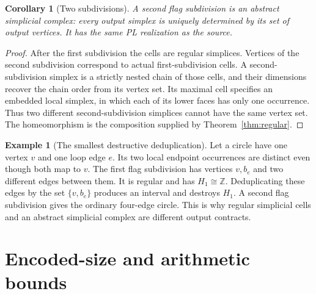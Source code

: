 \documentclass[11pt]{article}
\newtheorem{corollary}[theorem]{Corollary}
\theoremstyle{definition}\newtheorem{definition}[theorem]{Definition}
\newtheorem{example}[theorem]{Example}
\theoremstyle{remark}\newtheorem{remark}[theorem]{Remark}
\newcommand{\Z}{\mathbb Z}
\begin{document}
\begin{corollary}[Two subdivisions]\label{cor:two}
A second flag subdivision is an abstract simplicial complex: every output simplex is uniquely determined by its set of output vertices. It has the same PL realization as the source.
\end{corollary}
\begin{proof}
After the first subdivision the cells are regular simplices. Vertices of the second subdivision correspond to actual first-subdivision cells. A second-subdivision simplex is a strictly nested chain of those cells, and their dimensions recover the chain order from its vertex set. Its maximal cell specifies an embedded local simplex, in which each of its lower faces has only one occurrence. Thus two different second-subdivision simplices cannot have the same vertex set. The homeomorphism is the composition supplied by Theorem~\ref{thm:regular}.
\end{proof}

\begin{example}[The smallest destructive deduplication]\label{ex:loop}
Let a circle have one vertex \(v\) and one loop edge \(e\). Its two local endpoint occurrences are distinct even though both map to \(v\). The first flag subdivision has vertices \(v,b_e\) and two different edges between them. It is regular and has \(H_1\cong\Z\). Deduplicating these edges by the set \(\{v,b_e\}\) produces an interval and destroys \(H_1\). A second flag subdivision gives the ordinary four-edge circle. This is why regular simplicial cells and an abstract simplicial complex are different output contracts.
\end{example}

\section{Encoded-size and arithmetic bounds}
\label{sec:bounds}
\end{document}

